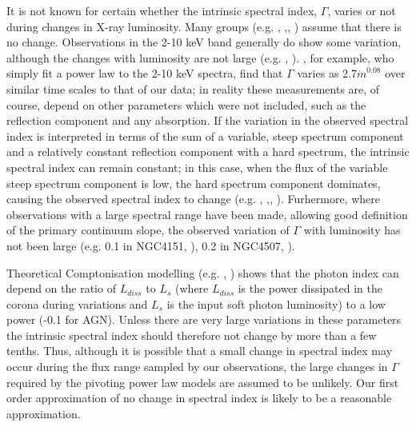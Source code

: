 \documentclass[useAMS,usenatbib]{sam}
\begin{document}
It is not known for certain whether the intrinsic spectral index, $\Gamma$, varies or not during changes in X-ray luminosity. Many groups (e.g. \citet{miller08},
\citet{turner07},\citet{fabian05}, \citet{pounds04}) assume that there is no change. Observations in the 2-10 keV band generally do show some variation, although the
changes with luminosity are not large (e.g. \citet{sobolewska}, \citet{zdziarski99}). \citet{sobolewska}, for example, who simply fit a power law to the 2-10 keV spectra,
find that $\Gamma$ varies as 2.7$\dot m ^{0.08}$ over similar time scales to that of our data; in reality these measurements are, of course, depend on other parameters
which were not included, such as the reflection component and any absorption. If the variation in the observed spectral index is interpreted in terms of the sum
of a variable, steep spectrum component and a relatively constant reflection component with a hard spectrum, the intrinsic spectral index can remain constant; in this
case, when the flux of the variable steep spectrum component is low, the hard spectrum component dominates, causing the observed spectral index to change (e.g.
\citet{guainazzi99}, \citet{uttley99},\citet{ponti}, \citet{fabian03}). Furhermore, where observations with a large spectral range have been made, allowing good
definition of the primary continuum slope, the observed variation of $\Gamma$ with luminosity has not been large (e.g. 0.1 in NGC4151, \citet{lubinski10}), 0.2 in
NGC4507, \citet{braito}).

Theoretical Comptonisation modelling (e.g. \citet{beloborodov99}, \citet{coppi92}) shows that the photon index can depend on the ratio of $L_{diss}$ to $L_s$ (where
$L_{diss}$ is the power dissipated in the corona during variations and $L_s$ is the input soft photon luminosity) to a low power (-0.1 for AGN). Unless there are very
large variations in these parameters the intrinsic spectral index should therefore not change by more than a few tenths. Thus, although it is possible that a small change
in spectral index may occur during the flux range sampled by our observations, the large changes in $\Gamma$ required by the pivoting power law models are assumed to
be unlikely. Our first order approximation of no change in spectral index is likely to be a reasonable approximation. 
\end{document}
